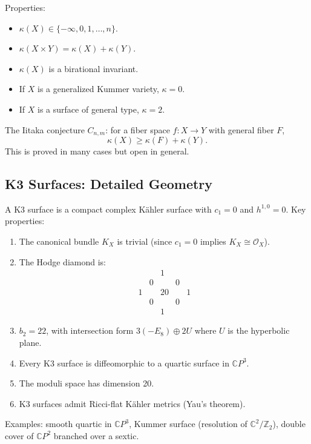 Properties:
\begin{itemize}
    \item $\kappa(X) \in \{-\infty, 0, 1, \ldots, n\}$.
    \item $\kappa(X \times Y) = \kappa(X) + \kappa(Y)$.
    \item $\kappa(X)$ is a birational invariant.
    \item If $X$ is a generalized Kummer variety, $\kappa = 0$.
    \item If $X$ is a surface of general type, $\kappa = 2$.
\end{itemize}

The Iitaka conjecture $C_{n,m}$: for a fiber space $f: X \to Y$ with general fiber $F$,
\[
\kappa(X) \geq \kappa(F) + \kappa(Y).
\]
This is proved in many cases but open in general.

\subsection{K3 Surfaces: Detailed Geometry}

A K3 surface is a compact complex K\"{a}hler surface with $c_1 = 0$ and $h^{1,0} = 0$. Key properties:
\begin{enumerate}
    \item The canonical bundle $K_X$ is trivial (since $c_1 = 0$ implies $K_X \cong \mathcal{O}_X$).
    \item The Hodge diamond is:
    \[
    \begin{matrix}
    & & 1 & & \\
    & 0 & & 0 & \\
    1 & & 20 & & 1 \\
    & 0 & & 0 & \\
    & & 1 & & 
    \end{matrix}
    \]
    \item $b_2 = 22$, with intersection form $3(-E_8) \oplus 2U$ where $U$ is the hyperbolic plane.
    \item Every K3 surface is diffeomorphic to a quartic surface in $\mathbb{C}P^3$.
    \item The moduli space has dimension 20.
    \item K3 surfaces admit Ricci-flat K\"{a}hler metrics (Yau's theorem).
\end{enumerate}

Examples: smooth quartic in $\mathbb{C}P^3$, Kummer surface (resolution of $\mathbb{C}^2/\mathbb{Z}_2$), double cover of $\mathbb{C}P^2$ branched over a sextic.

